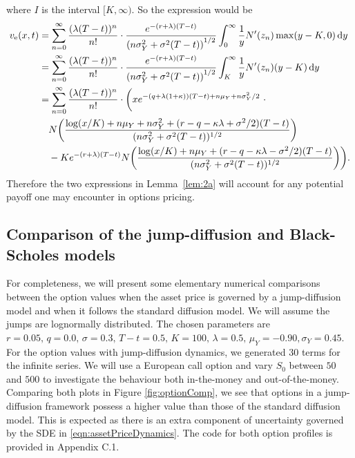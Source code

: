 {where $I$ is the interval $[K,\infty)$. So the expression would be
	\begin{align*}
		v_\text{e}(x,t) &=  \displaystyle\sum\limits_{n=0}^\infty\frac{(\lambda(T-t))^n}{n!}\cdot\frac{e^{-(r+\lambda)(T-t)}}{\left(n\sigma_Y^2 + \sigma^2(T-t)\right)^{1/2}}\int_0^\infty \frac{1}{y}N'(z_n) \max(y-K,0) \, \mathrm d y \\
		&= \displaystyle\sum\limits_{n=0}^\infty\frac{(\lambda(T-t))^n}{n!}\cdot\frac{e^{-(r+\lambda)(T-t)}}{\left(n\sigma_Y^2 + \sigma^2(T-t)\right)^{1/2}}\int_K^\infty \frac{1}{y}N'(z_n) (y-K) \, \mathrm d y \\
		&=  \displaystyle\sum\limits_{n=0}^\infty\frac{(\lambda(T-t))^n}{n!}\cdot\bigg( xe^{-(q+\lambda(1+\kappa))(T-t) + n\mu_Y + n\sigma_Y^2/2} \ \cdot \ \\
		&{} \quad  N\bigg( \frac{\log(x/K) + n\mu_Y + n\sigma_Y^2 + (r-q-\kappa\lambda + \sigma^2/2)(T-t)}{(n\sigma_Y^2 + \sigma^2(T-t))^{1/2}} \bigg) \\
		&{} \quad - Ke^{-(r+\lambda)(T-t)}N\bigg( \frac{\log(x/K) + n\mu_Y + (r-q-\kappa\lambda - \sigma^2/2)(T-t) }{(n\sigma_Y^2 + \sigma^2(T-t))^{1/2}} \bigg)\bigg).
			\end{align*}
Therefore the two expressions in Lemma~\ref{lem:2a} will account for any potential payoff one may encounter in options pricing.
}

\subsection{Comparison of the jump-diffusion and Black-Scholes models}
For completeness, we will present some elementary numerical comparisons between the option values when the asset price is governed by a jump-diffusion model and when it follows the standard diffusion model. We will assume the jumps are lognormally distributed. The chosen parameters are $r = 0.05, \, q = 0.0, \, \sigma = 0.3, \, T-t = 0.5, \, K = 100, \, \lambda = 0.5, \, \mu_Y = -0.90, \sigma_Y = 0.45$. For the option values with jump-diffusion dynamics, we generated 30 terms for the infinite series. We will use a European call option and vary $S_0$ between $50$ and $500$ to investigate the behaviour both in-the-money and out-of-the-money. Comparing both plots in Figure \ref{fig:optionComp}, we see that options in a jump-diffusion framework possess a higher value than those of the standard diffusion model. This is expected as there is an extra component of uncertainty governed by the SDE in \eqref{eqn:assetPriceDynamics}. The code for both option profiles is provided in Appendix C.1.

